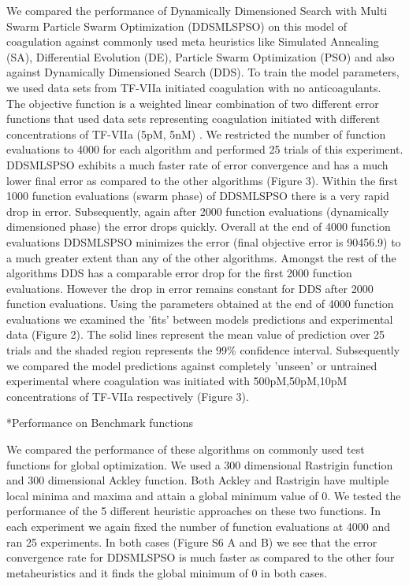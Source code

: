 \documentclass[12pt]{article}
\makeatletter
\renewcommand\subsection{\@startsection
	{subsection}{2}{0mm}
	{-0.05in}
	{-0.5\baselineskip}
	{\normalfont\normalsize\bfseries}}
\makeatother
\begin{document}
We compared the performance of Dynamically Dimensioned Search with Multi Swarm Particle Swarm Optimization (DDSMLSPSO) on this model of coagulation against commonly used meta heuristics like Simulated Annealing (SA), Differential Evolution (DE), Particle Swarm Optimization (PSO) and also against Dynamically Dimensioned Search (DDS). To train the model parameters, we used data sets from TF-VIIa initiated coagulation with no anticoagulants. The objective function is a weighted linear combination of two different error functions that used data sets representing coagulation initiated with different concentrations of TF-VIIa (5pM, 5nM) \cite{hockin2002model}. We restricted the number of function evaluations to 4000 for each algorithm and performed 25 trials of this experiment. DDSMLSPSO exhibits a much faster rate of error convergence and has a much lower final error as compared to the other algorithms (Figure 3). Within the first 1000 function evaluations (swarm phase) of DDSMLSPSO there is a very rapid drop in error. Subsequently, again after 2000 function evaluations (dynamically dimensioned phase) the error drops quickly. Overall at the end of 4000 function evaluations DDSMLSPSO minimizes the error (final objective error is 90456.9) to a much greater extent than any of the other algorithms. Amongst the rest of the algorithms DDS has a comparable error drop for the first 2000 function evaluations. However the drop in error remains constant for DDS after 2000 function evaluations. Using the parameters obtained at the end of 4000 function evaluations we examined the 'fits' between models predictions and experimental data (Figure 2). The solid lines represent the mean value of prediction over 25 trials and the shaded region represents the 99\% confidence interval. Subsequently we compared the model predictions against completely 'unseen' or untrained experimental where coagulation was initiated with 500pM,50pM,10pM concentrations of TF-VIIa respectively (Figure 3).  

\subsection*{Performance on Benchmark functions}
 
We compared the performance of these algorithms on commonly used test functions for global optimization. We used a 300 dimensional Rastrigin function and 300 dimensional Ackley function. Both Ackley and Rastrigin have multiple local minima and maxima and attain a global minimum value of 0. We tested the performance of the 5 different heuristic approaches on these two functions. In each experiment we again fixed the number of function evaluations at 4000 and ran 25 experiments. In both cases (Figure S6 A and B) we see that the error convergence rate for DDSMLSPSO is much faster as compared to the other four metaheuristics and it finds the global minimum of 0 in both cases.
\end{document}
